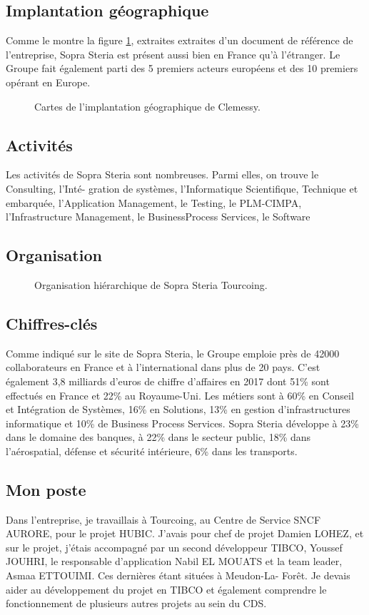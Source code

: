 \subsection{Implantation géographique}
Comme le montre la figure \ref{monde}, extraites extraites d'un document de référence de l'entreprise, Sopra
Steria est présent aussi bien en France qu'à l'étranger. Le Groupe fait également parti des 5
premiers acteurs européens et des 10 premiers opérant en Europe.\newline
\begin{figure}[!h]
	\centering \caption{Cartes de l'implantation géographique de Clemessy.}
	\label{monde}
	\centering
\end{figure}
\subsection{Activités}
Les activités de Sopra Steria sont nombreuses. Parmi elles, on trouve le Consulting, l'Inté-
gration de systèmes, l'Informatique Scientifique, Technique et embarquée, l'Application Management,
le Testing, le PLM-CIMPA, l'Infrastructure Management, le BusinessProcess Services,
le Software
\subsection{Organisation}
\begin{figure}[!h]
	\centering \caption{Organisation hiérarchique de Sopra Steria Tourcoing.}
	\label{organigramme}
	\centering
\end{figure}
\subsection{Chiffres-clés}Comme indiqué sur le site de Sopra Steria, le Groupe emploie près de 42000 collaborateurs
en France et à l'international dans plus de 20 pays. C'est également 3,8 milliards d'euros de
chiffre d'affaires en 2017 dont 51\% sont effectués en France et 22\% au Royaume-Uni.
Les métiers sont à 60\% en Conseil et Intégration de Systèmes, 16\% en Solutions, 13\% en gestion
d'infrastructures informatique et 10\% de Business Process Services. Sopra Steria développe à
23\% dans le domaine des banques, à 22\% dans le secteur public, 18\% dans l'aérospatial, défense
et sécurité intérieure, 6\% dans les transports.
\subsection{Mon poste}
Dans l'entreprise, je travaillais à Tourcoing, au Centre de Service SNCF AURORE, pour le
projet HUBIC. J'avais pour chef de projet Damien LOHEZ, et sur le projet, j'étais accompagné
par un second développeur TIBCO, Youssef JOUHRI, le responsable d'application Nabil EL
MOUATS et la team leader, Asmaa ETTOUIMI. Ces dernières étant situées à Meudon-La-
Forêt. Je devais aider au développement du projet en TIBCO et également comprendre le
fonctionnement de plusieurs autres projets au sein du CDS.